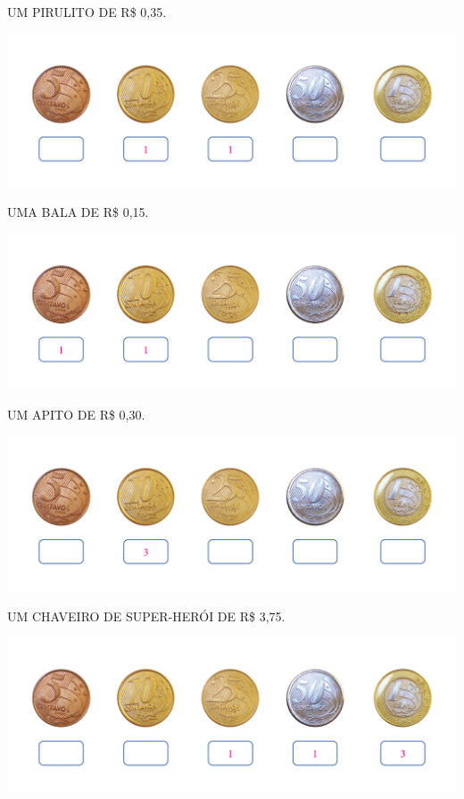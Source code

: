 \begin{escolha}
\item UM PIRULITO DE R\$ 0,35.

\includegraphics[width=.75\textwidth]{./media/SAEB_1ANO_MAT_FIGURA77.png}


\item UMA BALA DE R\$ 0,15.

\includegraphics[width=.75\textwidth]{./media/SAEB_1ANO_MAT_FIGURA78.png}


\item UM APITO DE R\$ 0,30.

\includegraphics[width=.75\textwidth]{./media/SAEB_1ANO_MAT_FIGURA79.png}


\item UM CHAVEIRO DE SUPER-HERÓI DE R\$ 3,75.

\includegraphics[width=.75\textwidth]{./media/SAEB_1ANO_MAT_FIGURA80.png}

\end{escolha}

